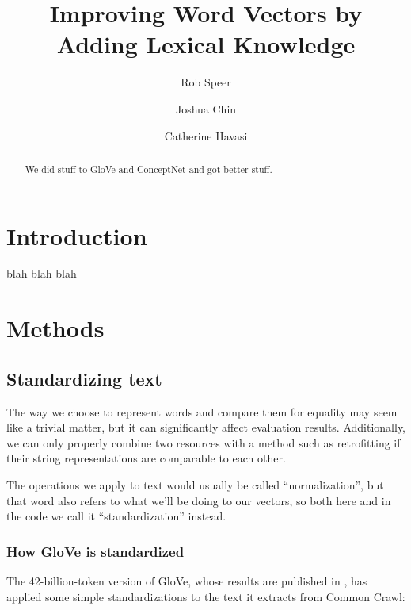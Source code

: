 \documentclass[12pt]{article}
\title{Improving Word Vectors by Adding Lexical Knowledge}
\author{Rob Speer \and Joshua Chin \and Catherine Havasi}
\begin{document}
\maketitle
\begin{abstract}
We did stuff to GloVe and ConceptNet and got better stuff.
\end{abstract}

\sloppy

\section{Introduction}
blah blah blah

\section{Methods}

\subsection{Standardizing text}


The way we choose to represent words and compare them for equality may seem
like a trivial matter, but it can significantly affect evaluation results.
Additionally, we can only properly combine two resources with a method such
as retrofitting if their string representations are comparable to each other.

The operations we apply to text would usually be called ``normalization'',
but that word also refers to what we'll be doing to our vectors, so both
here and in the code we call it ``standardization'' instead.

\subsubsection{How GloVe is standardized}

The 42-billion-token version of GloVe, whose results are published in
\cite{pennington2014glove}, has applied some simple standardizations
to the text it extracts from Common Crawl:
\end{document}
